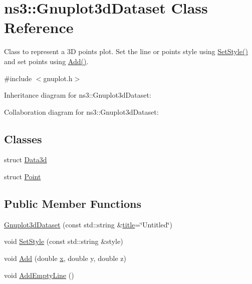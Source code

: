 \hypertarget{classns3_1_1Gnuplot3dDataset}{}\section{ns3\+:\+:Gnuplot3d\+Dataset Class Reference}
\label{classns3_1_1Gnuplot3dDataset}


Class to represent a 3D points plot. Set the line or points style using \hyperlink{classns3_1_1Gnuplot3dDataset_ae99331e66e6d5a39fdf407875be56f1f}{Set\+Style()} and set points using \hyperlink{classns3_1_1Gnuplot3dDataset_ad3a4b4baa637cfc099a488f3fcbf1975}{Add()}.  




{\ttfamily \#include $<$gnuplot.\+h$>$}



Inheritance diagram for ns3\+:\+:Gnuplot3d\+Dataset\+:


Collaboration diagram for ns3\+:\+:Gnuplot3d\+Dataset\+:
\subsection*{Classes}
\begin{DoxyCompactItemize}
\item 
struct \hyperlink{structns3_1_1Gnuplot3dDataset_1_1Data3d}{Data3d}
\item 
struct \hyperlink{structns3_1_1Gnuplot3dDataset_1_1Point}{Point}
\end{DoxyCompactItemize}
\subsection*{Public Member Functions}
\begin{DoxyCompactItemize}
\item 
\hyperlink{classns3_1_1Gnuplot3dDataset_a4b336002860c7b39bffc89213601151f}{Gnuplot3d\+Dataset} (const std\+::string \&\hyperlink{lte__link__budget__x2__handover__measures_8m_a3f4b991df405379f6917e1683ed5a8c8}{title}=\char`\"{}Untitled\char`\"{})
\item 
void \hyperlink{classns3_1_1Gnuplot3dDataset_ae99331e66e6d5a39fdf407875be56f1f}{Set\+Style} (const std\+::string \&style)
\item 
void \hyperlink{classns3_1_1Gnuplot3dDataset_ad3a4b4baa637cfc099a488f3fcbf1975}{Add} (double \hyperlink{lte__link__budget__x2__handover__measures_8m_a9336ebf25087d91c818ee6e9ec29f8c1}{x}, double y, double z)
\item 
void \hyperlink{classns3_1_1Gnuplot3dDataset_a0a56512b7f6c6c75622a3981c69c07ec}{Add\+Empty\+Line} ()
\end{DoxyCompactItemize}
